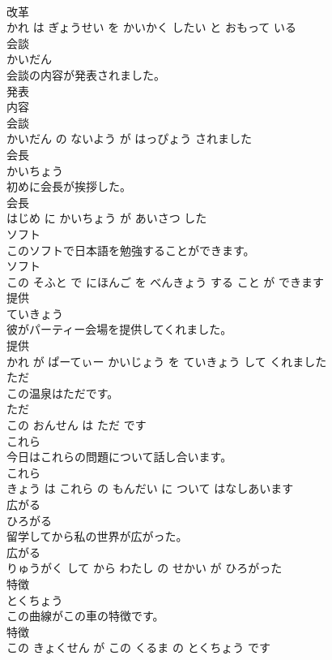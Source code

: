 \documentclass[8pt]{extreport}
\begin{document}
\begin{CJK}{UTF8}{min}
\\	改革 
\\	かれ は ぎょうせい を かいかく したい と おもって いる			
\\	会談	
\\	かいだん			
\\	会談の内容が発表されました。	
\\	発表 
\\	内容 
\\	会談 
\\	かいだん の ないよう が はっぴょう されました			
\\	会長	
\\	かいちょう			
\\	初めに会長が挨拶した。	
\\	会長 
\\	はじめ に かいちょう が あいさつ した			
\\	ソフト	
\\	このソフトで日本語を勉強することができます。	
\\	ソフト 
\\	この そふと で にほんご を べんきょう する こと が できます			
\\	提供	
\\	ていきょう			
\\	彼がパーティー会場を提供してくれました。	
\\	提供 
\\	かれ が ぱーてぃー かいじょう を ていきょう して くれました			
\\	ただ	
\\	この温泉はただです。	
\\	ただ 
\\	この おんせん は ただ です			
\\	これら	
\\	今日はこれらの問題について話し合います。	
\\	これら 
\\	きょう は これら の もんだい に ついて はなしあいます			
\\	広がる	
\\	ひろがる			
\\	留学してから私の世界が広がった。	
\\	広がる 
\\	りゅうがく して から わたし の せかい が ひろがった			
\\	特徴	
\\	とくちょう			
\\	この曲線がこの車の特徴です。	
\\	特徴 
\\	この きょくせん が この くるま の とくちょう です			

\end{CJK}
\end{document}
